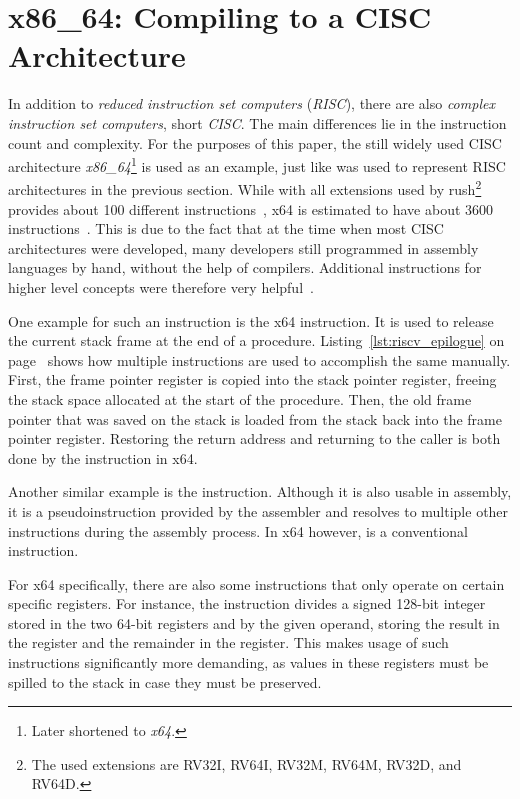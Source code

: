 \newpage
\section{x86\_64: Compiling to a CISC Architecture}

In addition to \emph{reduced instruction set computers} (\emph{RISC}), there are also \emph{complex instruction set computers}, short \emph{CISC}.
The main differences lie in the instruction count and complexity.
For the purposes of this paper, the still widely used CISC architecture \emph{x86\_64}\footnote{Later shortened to \emph{x64}.} is used as an example, just like \riscv{} was used to represent RISC architectures in the previous section.
While \riscv{} with all extensions used by rush\footnote{The used extensions are RV32I, RV64I, RV32M, RV64M, RV32D, and RV64D.} provides about 100 different instructions~\cite[Chapter~24]{Waterman2019}, x64 is estimated to have about 3600 instructions~\cite{Rodgers2017}.
This is due to the fact that at the time when most CISC architectures were developed, many developers still programmed in assembly languages by hand, without the help of compilers.
Additional instructions for higher level concepts were therefore very helpful~\cite[p.~9]{Dandamudi2005Risc}.

One example for such an instruction is the x64  instruction.
It is used to release the current stack frame at the end of a procedure.
Listing~\ref{lst:riscv_epilogue} on page~\pageref{lst:riscv_epilogue} shows how multiple \riscv{} instructions are used to accomplish the same manually.
First, the frame pointer register is copied into the stack pointer register, freeing the stack space allocated at the start of the procedure.
Then, the old frame pointer that was saved on the stack is loaded from the stack back into the frame pointer register.
Restoring the return address and returning to the caller is both done by the  instruction in x64.

Another similar example is the  instruction.
Although it is also usable in \riscv{} assembly, it is a pseudoinstruction provided by the assembler and resolves to multiple other \riscv{} instructions during the assembly process.
In x64 however,  is a conventional instruction.

For x64 specifically, there are also some instructions that only operate on certain specific registers.
For instance, the \label{x64_idiv} instruction divides a signed 128-bit integer stored in the two 64-bit registers  and  by the given operand, storing the result in the  register and the remainder in the  register. This makes usage of such instructions significantly more demanding, as values in these registers must be spilled to the stack in case they must be preserved.

